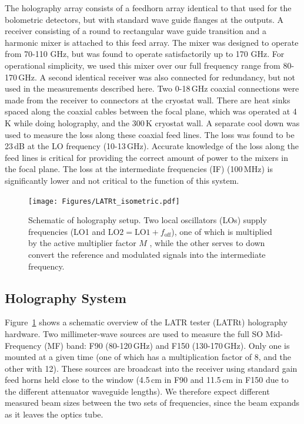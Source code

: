 The holography array consists of a feedhorn array identical to that used for the bolometric detectors, but with standard wave guide flanges at the outputs. A receiver consisting of a round to rectangular wave guide transition and a harmonic mixer is attached to this feed array.  The mixer was designed to operate from 70-110 GHz, but was found to operate satisfactorily up to 170 GHz. For operational simplicity, we used this mixer over our full frequency range from 80-170\,GHz.
A second identical receiver was also connected for redundancy, but not used in the measurements described here.   Two 0-18\,GHz coaxial connections were made from the receiver to connectors at the cryostat wall.  There are heat sinks spaced along the coaxial cables between the focal plane, which was operated at 4\,K while doing holography, and the 300\,K cryostat wall.  A separate cool down was used to measure the loss along these coaxial feed lines.  The loss  was found to be 23\,dB at the LO frequency (10-13\,GHz).  Accurate knowledge of the loss along the feed lines is critical for providing the correct amount of power to the mixers in the focal plane.  The loss at the intermediate frequencies (IF) (100\,MHz) is significantly lower and not critical to the function of this system.

\begin{figure}
    \centering
    \texttt{[image: Figures/LATRt\_isometric.pdf]}
    \caption{Schematic of holography setup.  Two local oscillators (LOs) supply frequencies (LO1 and $\text{LO2} = \text{LO1} + f_{\text{off}}$), one of which is multiplied by the active multiplier factor $M$ , while the other serves to down convert the reference and modulated signals into the intermediate frequency.}
    \label{fig:setup}
\end{figure}

\subsection{Holography System}
\label{sec:meas_hardware}

Figure~\ref{fig:setup} shows a schematic overview of the LATR tester (LATRt) holography hardware.  Two millimeter-wave sources are used to measure the full SO Mid-Frequency (MF) band: F90 (80-120\,GHz) and F150 (130-170\,GHz).  Only one is mounted at a given time (one of which has a multiplication factor of 8, and the other with 12).  These sources are broadcast into the receiver using standard gain feed horns held close to the window (4.5\,cm in F90 and 11.5\,cm in F150 due to the different attenuator waveguide lengths).  We therefore expect different measured beam sizes between the two sets of frequencies, since the beam expands as it leaves the optics tube.

